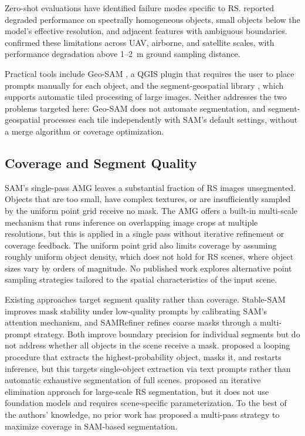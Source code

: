 \documentclass[review,11pt,authoryear]{elsarticle}
\begin{document}
Zero-shot evaluations have identified failure modes specific to RS. \citet{ren2024segment_anything_everywhere} reported degraded performance on spectrally homogeneous objects, small objects below the model's effective resolution, and adjacent features with ambiguous boundaries. \citet{osco2023sam_rs_review} confirmed these limitations across UAV, airborne, and satellite scales, with performance degradation above 1--2~m ground sampling distance.

Practical tools include Geo-SAM \citep{zhao2023geosam}, a QGIS plugin that requires the user to place prompts manually for each object, and the segment-geospatial library \citep{wu2023samgeo}, which supports automatic tiled processing of large images. Neither addresses the two problems targeted here: Geo-SAM does not automate segmentation, and segment-geospatial processes each tile independently with SAM's default settings, without a merge algorithm or coverage optimization.

\subsection{Coverage and Segment Quality}
\label{sec:related_coverage}

SAM's single-pass AMG leaves a substantial fraction of RS images unsegmented. Objects that are too small, have complex textures, or are insufficiently sampled by the uniform point grid receive no mask. The AMG offers a built-in multi-scale mechanism that runs inference on overlapping image crops at multiple resolutions, but this is applied in a single pass without iterative refinement or coverage feedback. The uniform point grid also limits coverage by assuming roughly uniform object density, which does not hold for RS scenes, where object sizes vary by orders of magnitude. No published work explores alternative point sampling strategies tailored to the spatial characteristics of the input scene.

Existing approaches target segment quality rather than coverage. Stable-SAM \citep{fan2025stablesam} improves mask stability under low-quality prompts by calibrating SAM's attention mechanism, and SAMRefiner \citep{lin2025samrefiner} refines coarse masks through a multi-prompt strategy. Both improve boundary precision for individual segments but do not address whether all objects in the scene receive a mask. \citet{osco2023sam_rs_review} proposed a looping procedure that extracts the highest-probability object, masks it, and restarts inference, but this targets single-object extraction via text prompts rather than automatic exhaustive segmentation of full scenes. \citet{shepherd2019large_scale} proposed an iterative elimination approach for large-scale RS segmentation, but it does not use foundation models and requires scene-specific parameterization. To the best of the authors' knowledge, no prior work has proposed a multi-pass strategy to maximize coverage in SAM-based segmentation.
\end{document}
